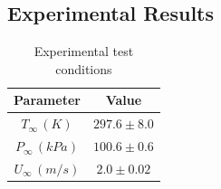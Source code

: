 \documentclass[preprint,12pt]{elsarticle}
\begin{document}
\subsection{Experimental Results}

%
%
\begin{table}[!t!b!p]
\begin{center}
\begin{tabular}{ c c }
\hline
Parameter    & Value \\ \hline
$T_{\infty} \, (K) $ & $297.6\pm8.0$ \\
$P_{\infty} \, (kPa) $ & $100.6\pm0.6$ \\ 
$U_{\infty} \, (m/s) $ & $2.0\pm0.02$ \\ \hline
\end{tabular}
\caption{Experimental test conditions}
\label{tab:ETjet}
\end{center}
\end{table}
%
\end{document}

